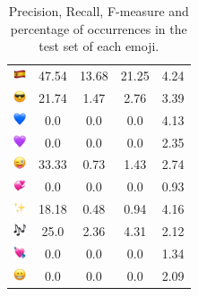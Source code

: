 \documentclass{article}
\begin{document}
\begin{table}
\begin{tabular}{|c|ccc|c|}
\includegraphics[height=0.37cm,width=0.37cm]{img/Spain.png} & 47.54 & 13.68 & 21.25 & 4.24\\ 
\includegraphics[height=0.37cm,width=0.37cm]{img/smiling_face_with_sunglasses.png} & 21.74 & 1.47 & 2.76 & 3.39\\ 
\includegraphics[height=0.37cm,width=0.37cm]{img/blue_heart.png} & 0.0 & 0.0 & 0.0 & 4.13\\ 
\includegraphics[height=0.37cm,width=0.37cm]{img/purple_heart.png} & 0.0 & 0.0 & 0.0 & 2.35\\ 
\includegraphics[height=0.37cm,width=0.37cm]{img/winking_face_with_tongue.png} & 33.33 & 0.73 & 1.43 & 2.74\\ 
\includegraphics[height=0.37cm,width=0.37cm]{img/revolving_hearts.png} & 0.0 & 0.0 & 0.0 & 0.93\\ 
\includegraphics[height=0.37cm,width=0.37cm]{img/sparkles.png} & 18.18 & 0.48 & 0.94 & 4.16\\ 
\includegraphics[height=0.37cm,width=0.37cm]{img/musical_notes.png} & 25.0 & 2.36 & 4.31 & 2.12\\ 
\includegraphics[height=0.37cm,width=0.37cm]{img/heart_with_arrow.png} & 0.0 & 0.0 & 0.0 & 1.34\\ 
\includegraphics[height=0.37cm,width=0.37cm]{img/beaming_face_with_smiling_eyes.png} & 0.0 & 0.0 & 0.0 & 2.09\\ 

\hline
\end{tabular}
\caption{\label{table:emoji_detailed} Precision, Recall, F-measure and percentage of occurrences in the test set of each emoji.}
\end{table}
\end{document}
